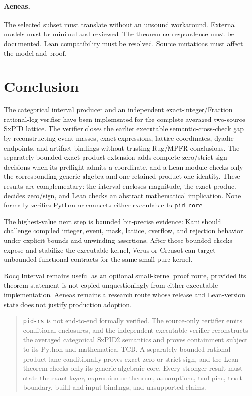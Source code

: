 \documentclass[11pt]{article}
\begin{document}
\paragraph{Aeneas.}
The selected subset must translate without an unsound workaround.  External models must be minimal
and reviewed.  The theorem correspondence must be documented.  Lean compatibility must be
resolved.  Source mutations must affect the model and proof.

\section{Conclusion}

The categorical interval producer and an independent exact-integer/Fraction rational-log verifier
have been implemented for the complete averaged two-source SxPID lattice.  The verifier closes the
earlier executable semantic-cross-check gap by reconstructing event masses, exact expressions,
lattice coordinates, dyadic endpoints, and artifact bindings without trusting Rug/MPFR
conclusions.  The separately bounded exact-product extension adds complete zero/strict-sign
decisions when its preflight admits a coordinate, and a Lean module checks only the corresponding
generic algebra and one retained product-one identity.  These results are complementary: the
interval encloses magnitude, the exact product decides zero/sign, and Lean checks an abstract
mathematical implication.  None formally verifies Python or connects either executable to
\texttt{pid-core}.

The highest-value next step is bounded bit-precise evidence: Kani should challenge compiled
integer, event, mask, lattice, overflow, and rejection behavior under explicit bounds and
unwinding assertions.  After those bounded checks expose and stabilize the executable kernel,
Verus or Creusot can target unbounded functional contracts for the same small pure kernel.

Rocq Interval remains useful as an optional small-kernel proof route, provided its theorem
statement is not copied unquestioningly from either executable implementation.  Aeneas remains a
research route whose release and Lean-version state does not justify production adoption.

\begin{quote}
\texttt{pid-rs} is not end-to-end formally verified.  The source-only certifier emits conditional
enclosures, and the independent executable verifier reconstructs the averaged categorical SxPID2
semantics and proves containment subject to its Python and mathematical TCB\@.  A separately
bounded rational-product lane conditionally proves exact zero or strict sign, and the Lean theorem
checks only its generic algebraic core.  Every stronger result must state the exact layer,
expression or theorem, assumptions, tool pins, trust boundary, build and input bindings, and
unsupported claims.
\end{quote}
\end{document}

